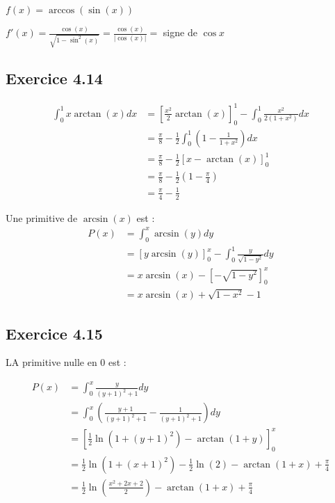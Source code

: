 \documentclass[a4paper,10pt]{report}
\begin{document}
$f(x) = \arccos(\sin(x)) $

$f'(x) = \frac{\cos(x)}{\sqrt{1-\sin^2(x)}} = \frac{\cos(x)}{|\cos(x)|} =$ signe de $\cos x$

\subsection*{Exercice 4.14}

\begin{equation*}
	\begin{split}
		\int_0^1 x \arctan(x) dx &= \left[ \frac{x^2}{2} \arctan(x) \right] _0^1 - \int_0^1 \frac{x^2}{2(1+x^2)} dx \\
		                         &= \frac{\pi}{8} - \frac{1}{2} \int_0^1 \left( 1 - \frac{1}{1+x^2}\right) dx \\
		                         &= \frac{\pi}{8} - \frac{1}{2}\left[ x -\arctan(x) \right]_0^1 \\
		                         &= \frac{\pi}{8} - \frac{1}{2} \left(1 - \frac{\pi}{4}  \right)  \\
		                         &= \frac{\pi}{4} - \frac{1}{2}
	\end{split}
\end{equation*}

Une primitive de $\arcsin(x)$ est :
\begin{equation*}
	\begin{split}
		P(x) &= \int_0^x \arcsin(y) dy \\
		     &= \left[ y \arcsin(y) \right]_0^x - \int_0^1 \frac{y}{\sqrt{1-y^2}} dy \\
		     &= x \arcsin(x) - [-\sqrt{1-y^2}]_0^x \\
		     &= x \arcsin(x) + \sqrt{1-x^2} -1
	\end{split}
\end{equation*}

\subsection*{Exercice 4.15}

LA primitive nulle en $0$ est :

\begin{equation*}
	\begin{split}
		P(x) &= \int_0^x \frac{y}{(y+1)^2 +1} dy \\
		     &= \int_0^x \left( \frac{y+1}{(y+1)^2 +1} -  \frac{1}{(y+1)^2 +1}\right) dy \\
		     &= \left[ \frac{1}{2}\ln( 1 + (y+1)^2) -\arctan(1+y) \right]_0^x \\
		     &= \frac{1}{2}\ln( 1 + (x+1)^2) - \frac{1}{2}\ln( 2) - \arctan(1+x) + \frac{\pi}{4} \\
		     &= \frac{1}{2}\ln\left(\frac{x^2 +2x +2}{2}\right) - \arctan(1+x) + \frac{\pi}{4}
	\end{split}
\end{equation*}
\end{document}
